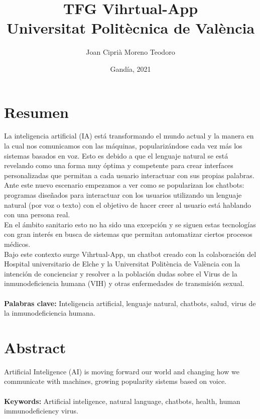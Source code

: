 \documentclass[11pt]{book}
\title{
{TFG Vihrtual-App}\\
{\large Universitat Politècnica de València}\\
}
\author{Joan Ciprià Moreno Teodoro}
\date{Gandía, 2021}
\begin{document}
\maketitle

\chapter*{Resumen}
\cite{healthAgents}
La inteligencia artificial (IA) está transformando el mundo actual y la manera en la cual nos comunicamos con las máquinas, popularizándose cada vez más los sistemas basados en voz. Esto es debido a que el lenguaje natural se está revelando como una forma muy óptima y competente para crear interfaces personalizadas que permitan a cada usuario interactuar con sus propias palabras. \\

Ante este nuevo escenario empezamos a ver como se popularizan los chatbots: programas diseñados para interactuar con los usuarios utilizando un lenguaje natural (por voz o texto) con el objetivo de hacer creer al usuario está hablando con una persona real. \\

En el ámbito sanitario esto no ha sido una excepción y se siguen estas tecnologías con gran interés en busca de sistemas que permitan automatizar ciertos procesos médicos. \\

Bajo este contexto surge Vihrtual-App, un chatbot creado con la colaboración del Hospital universitario de Elche y la Universitat Politència de València con la intención de concienciar y resolver a la población dudas sobre el Virus de la inmunodeficiencia humana (VIH) y otras enfermedades de transmisión sexual.
\\
\\
\textbf{Palabras clave:} Inteligencia artificial, lenguaje natural, chatbots, salud, virus de la inmunodeficiencia humana.

\chapter*{Abstract}
Artificial Inteligence (AI) is moving forward our world and changing how we   communicate with machines, growing popularity sistems based on voice.
\\
\\
\textbf{Keywords:} Artificial inteligence, natural language, chatbots, health, human immunodeficiency virus. 
\end{document}
